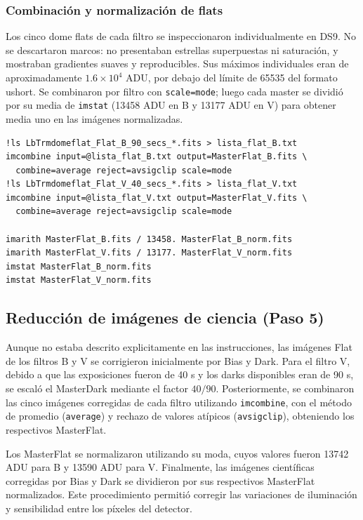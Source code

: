 \documentclass[10pt,a4paper,twocolumn]{article}
\begin{document}
\subsubsection{Combinación y normalización de flats}

Los cinco dome flats de cada filtro se inspeccionaron individualmente en
DS9. No se descartaron marcos: no presentaban estrellas superpuestas ni
saturación, y mostraban gradientes suaves y reproducibles. Sus máximos
individuales eran de aproximadamente $1.6\times10^{4}$ ADU, por debajo
del límite de 65535 del formato ushort. Se combinaron por filtro con
\texttt{scale=mode}; luego cada master se dividió por su media de
\texttt{imstat} (13458 ADU en B y 13177 ADU en V) para obtener media
uno en las imágenes normalizadas.

\begin{lstlisting}
!ls LbTrmdomeflat_Flat_B_90_secs_*.fits > lista_flat_B.txt
imcombine input=@lista_flat_B.txt output=MasterFlat_B.fits \
  combine=average reject=avsigclip scale=mode
!ls LbTrmdomeflat_Flat_V_40_secs_*.fits > lista_flat_V.txt
imcombine input=@lista_flat_V.txt output=MasterFlat_V.fits \
  combine=average reject=avsigclip scale=mode

imarith MasterFlat_B.fits / 13458. MasterFlat_B_norm.fits
imarith MasterFlat_V.fits / 13177. MasterFlat_V_norm.fits
imstat MasterFlat_B_norm.fits
imstat MasterFlat_V_norm.fits
\end{lstlisting}


\subsection{Reducción de imágenes de ciencia (Paso 5)}

Aunque no estaba descrito explicitamente en las instrucciones, las imágenes Flat de los filtros B y V se corrigieron inicialmente por Bias y Dark. Para el filtro V, debido a que las exposiciones fueron de 40 s y los darks disponibles eran de 90 s, se escaló el MasterDark mediante el factor $40/90$. Posteriormente, se combinaron las cinco imágenes corregidas de cada filtro utilizando \texttt{imcombine}, con el método de promedio (\texttt{average}) y rechazo de valores atípicos (\texttt{avsigclip}), obteniendo los respectivos MasterFlat.

Los MasterFlat se normalizaron utilizando su moda, cuyos valores fueron 13742 ADU para B y 13590 ADU para V. Finalmente, las imágenes científicas corregidas por Bias y Dark se dividieron por sus respectivos MasterFlat normalizados. Este procedimiento permitió corregir las variaciones de iluminación y sensibilidad entre los píxeles del detector.\\
\end{document}
